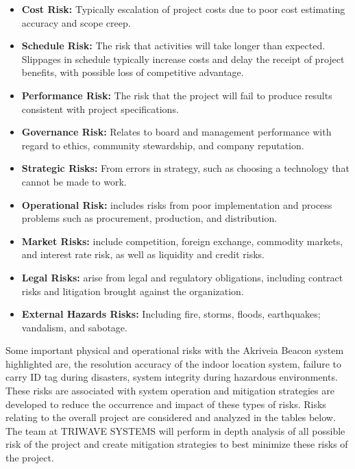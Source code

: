 \begin{itemize}
\setlength\itemsep{0.1mm}
	\item \textbf{Cost Risk:} Typically escalation of project costs due to poor cost estimating accuracy and scope creep.
	\item \textbf{Schedule Risk:} The risk that activities will take longer than expected. Slippages in schedule typically increase costs and delay the receipt of project benefits, with possible loss of competitive advantage.
	\item \textbf{Performance Risk:} The risk that the project will fail to produce results consistent with project specifications.
	\item \textbf{Governance Risk:} Relates to board and management performance with regard to ethics, community stewardship, and company reputation.
	\item \textbf{Strategic Risks:} From errors in strategy, such as choosing a technology that cannot be made to work.
	\item \textbf{Operational Risk:} includes risks from poor implementation and process problems such as procurement, production, and distribution.
	\item \textbf{Market Risks:} include competition, foreign exchange, commodity markets, and interest rate risk, as well as liquidity and credit risks.
	\item \textbf{Legal Risks:} arise from legal and regulatory obligations, including contract risks and litigation brought against the organization.
	\item \textbf{External Hazards Risks:} Including fire, storms, floods, earthquakes; vandalism, and sabotage.
\end{itemize}

Some important physical and operational risks with the Akriveia Beacon system highlighted are, the resolution accuracy of the indoor location system, failure to carry ID tag during disasters, system integrity during hazardous environments. These risks are associated with system operation and mitigation strategies are developed to reduce the occurrence and impact of these types of risks. Risks relating to the overall project are considered and analyzed in the tables below. The team at TRIWAVE SYSTEMS will perform in depth analysis of all possible risk of the project and create mitigation strategies to best minimize these risks of the project.


